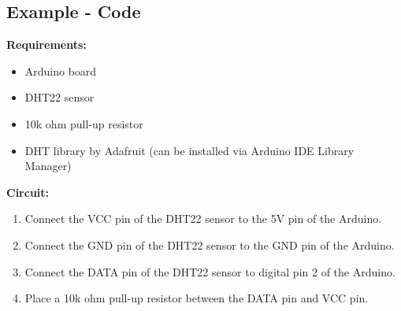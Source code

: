 \subsection{Example - Code}

\textbf{Requirements:} 

\begin{itemize}
	\item Arduino board 
	\item DHT22 sensor
	\item 10k ohm pull-up resistor
	\item DHT library by Adafruit (can be installed via Arduino IDE Library Manager)
\end{itemize}


\textbf{Circuit:} 


\begin{enumerate}
	\item Connect the VCC pin of the DHT22 sensor to the 5V pin of the Arduino.
	\item Connect the GND pin of the DHT22 sensor to the GND pin of the Arduino.
	\item Connect the DATA pin of the DHT22 sensor to digital pin 2 of the Arduino.
	\item Place a 10k ohm pull-up resistor between the DATA pin and VCC pin.
\end{enumerate}

